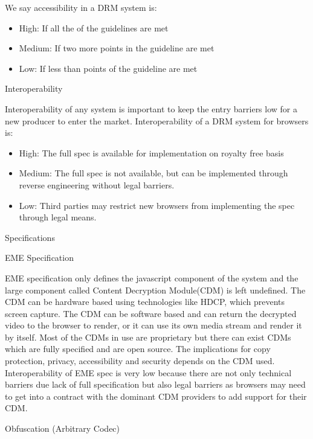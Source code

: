We say accessibility in a DRM system is:

\begin{itemize}
\tightlist
\item
  High: If all the of the guidelines are met
\item
  Medium: If two more points in the guideline are met
\item
  Low: If less than points of the guideline are met
\end{itemize}

\protect\hypertarget{anchor-9}{}{}Interoperability

Interoperability of any system is important to keep the entry barriers
low for a new producer to enter the market. Interoperability of a DRM
system for browsers is:

\begin{itemize}
\tightlist
\item
  High: The full spec is available for implementation on royalty free
  basis
\item
  Medium: The full spec is not available, but can be implemented through
  reverse engineering without legal barriers.
\item
  Low: Third parties may restrict new browsers from implementing the
  spec through legal means.
\end{itemize}

\protect\hypertarget{anchor-10}{}{}Specifications

\protect\hypertarget{anchor-11}{}{}EME Specification

EME specification only defines the javascript component of the system
and the large component called Content Decryption Module(CDM) is left
undefined. The CDM can be hardware based using technologies like HDCP,
which prevents screen capture. The CDM can be software based and can
return the decrypted video to the browser to render, or it can use its
own media stream and render it by itself. Most of the CDMs in use are
proprietary but there can exist CDMs which are fully specified and are
open source. The implications for copy protection, privacy,
accessibility and security depends on the CDM used. Interoperability of
EME spec is very low because there are not only technical barriers due
lack of full specification but also legal barriers as browsers may need
to get into a contract with the dominant CDM providers to add support
for their CDM.

\protect\hypertarget{anchor-12}{}{}Obfuscation (Arbitrary Codec)

